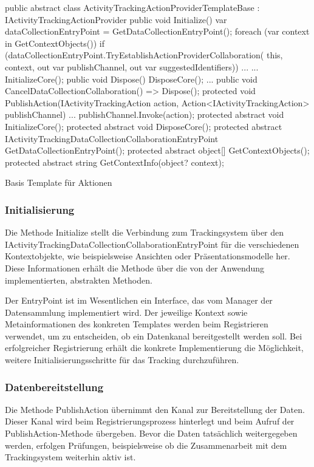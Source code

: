 \begin{program}[H]
\begin{CsCode}
public abstract class ActivityTrackingActionProviderTemplateBase : IActivityTrackingActionProvider{
    public void Initialize(){
        var dataCollectionEntryPoint = GetDataCollectionEntryPoint();
        foreach (var context in GetContextObjects()){
            if (dataCollectionEntryPoint.TryEstablishActionProviderCollaboration(
                    this, context, out var publishChannel, out var suggestedIdentifiers))
            {
                ...
            }
        }
        ...
        InitializeCore();
    }
    public void Dispose(){
        DisposeCore();
        ...
    }
    public void CancelDataCollectionCollaboration() => Dispose();
    protected void PublishAction(IActivityTrackingAction action, Action<IActivityTrackingAction> publishChannel){
        ...
        publishChannel.Invoke(action);
    }
    protected abstract void InitializeCore();
    protected abstract void DisposeCore();
    protected abstract IActivityTrackingDataCollectionCollaborationEntryPoint GetDataCollectionEntryPoint();
    protected abstract object[] GetContextObjects();
    protected abstract string GetContextInfo(object? context);
}
\end{CsCode}
\caption{Basis Template für Aktionen}
\label{prog:base_template_actions}
\end{program}

\subsubsection{Initialisierung}
Die Methode Initialize stellt die Verbindung zum Trackingsystem über den IActivityTrackingDataCollectionCollaborationEntryPoint für die verschiedenen Kontextobjekte, wie beispielsweise Ansichten oder Präsentationsmodelle her. Diese Informationen erhält die Methode über die von der Anwendung implementierten, abstrakten Methoden.

Der EntryPoint ist im Wesentlichen ein Interface, das vom Manager der Datensammlung implementiert wird. Der jeweilige Kontext sowie Metainformationen des konkreten Templates werden beim Registrieren verwendet, um zu entscheiden, ob ein Datenkanal bereitgestellt werden soll. Bei erfolgreicher Registrierung erhält die konkrete Implementierung die Möglichkeit, weitere Initialisierungsschritte für das Tracking durchzuführen.

\subsubsection{Datenbereitstellung}
Die Methode PublishAction übernimmt den Kanal zur Bereitstellung der Daten. Dieser Kanal wird beim Registrierungsprozess hinterlegt und beim Aufruf der PublishAction-Methode übergeben. Bevor die Daten tatsächlich weitergegeben werden, erfolgen Prüfungen, beispielsweise ob die Zusammenarbeit mit dem Trackingsystem weiterhin aktiv ist.

